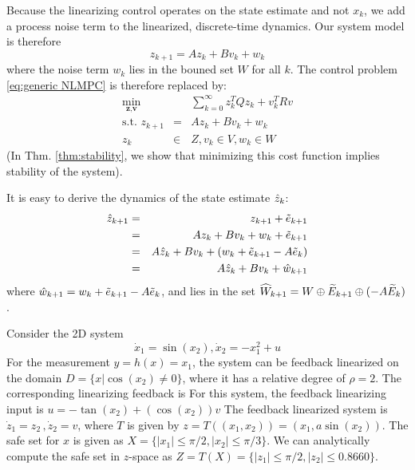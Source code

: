 Because the linearizing control operates on the state estimate and not $x_k$, we add a process noise term to the linearized, discrete-time dynamics. 
Our system model is therefore
\begin{equation}
\label{eq:discrete linear dyn}
z_{k+1} = Az_k + Bv_k + w_k
\end{equation}
where the noise term $w_k$ lies in the bouned set $W$ for all $k$.
The control problem \eqref{eq:generic NLMPC} is therefore replaced by:
\begin{eqnarray}
\label{eq:discrete linear problem}
\min_{\textbf{z},\textbf{v}} &\;& \sum_{k=0}^{\infty}z_k^TQz_k + v_k^TRv \\
\text{s.t. } z_{k+1} &=& Az_k + Bv_k + w_k\nonumber \\
z_k&\in& Z,  v_k \in V,w_k \in W  \nonumber
\end{eqnarray}
(In Thm. \ref{thm:stability}, we show that minimizing this cost function implies stability of the system).

It is easy to derive the dynamics of the state estimate $\hat{z}_{k}$: 
\begin{eqnarray}
\label{eq:dynamics_estimate}
\hat{z}_{k+1} &=& z_{k+1} + \tilde{e}_{k+1} \\
&=&Az_k + Bv_k + w_k + \tilde{e}_{k+1}  \nonumber\\
&=&A\hat{z}_k + Bv_k + (w_k+ \tilde{e}_{k+1} -A \tilde{e}_{k}) \nonumber\\
&=&A\hat{z}_k + Bv_k + \hat{w}_{k+1} \nonumber
\end{eqnarray}
where $\hat{w}_{k+1} = w_k+ \tilde{e}_{k+1} -A \tilde{e}_{k}$, and lies in the set $\widehat{W}_{k+1} = W\oplus\widetilde{E}_{k+1}\oplus(-A\widetilde{E}_k)$. 


\begin{exmp}
	Consider the 2D system 
	\begin{equation}
	\label{eq:toy_dynamics}
	\dot{x}_1 = \sin(x_2) , \dot{x}_2 =-x_1^2 + u 
	\end{equation}
	For the measurement $y = h(x) = x_1$, the system can be feedback linearized on the domain $D = \lbrace x | \cos(x_2) \neq 0 \rbrace $, where it has a relative degree of $\rho=2$. 
	The corresponding linearizing feedback is For this system, the feedback linearizing input is $u = -\tan(x_2) + (\cos(x_2))v$
	The feedback linearized system is $\dot{z}_1 = z_2\, ,\dot{z}_2 = v$, where $T$ is given by $z=T((x_1,x_2)) = (x_1, a\sin(x_2))$.	
	The safe set for $x$ is given as $X = \lbrace |x_1| \leq \pi /2, |x_2| \leq \pi/3 \rbrace$. 
	We can analytically compute the safe set in $z$-space as $Z = T(X) =  \lbrace |z_1| \leq \pi /2, |z_2| \leq 0.8660\rbrace$.
	\exmend
\end{exmp}


